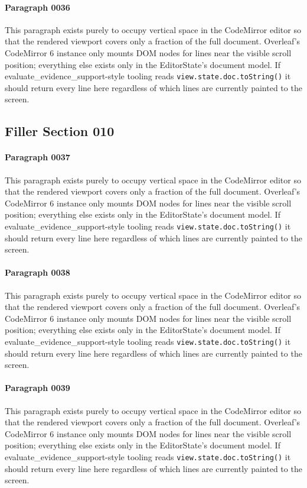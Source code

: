 \documentclass{article}
\begin{document}
\paragraph{Paragraph 0036}
This paragraph exists purely to occupy vertical space in the CodeMirror editor so that the rendered viewport covers only a fraction of the full document. Overleaf's CodeMirror 6 instance only mounts DOM nodes for lines near the visible scroll position; everything else exists only in the EditorState's document model. If evaluate\_evidence\_support-style tooling reads \texttt{view.state.doc.toString()} it should return every line here regardless of which lines are currently painted to the screen.

\subsection{Filler Section 010}
\paragraph{Paragraph 0037}
This paragraph exists purely to occupy vertical space in the CodeMirror editor so that the rendered viewport covers only a fraction of the full document. Overleaf's CodeMirror 6 instance only mounts DOM nodes for lines near the visible scroll position; everything else exists only in the EditorState's document model. If evaluate\_evidence\_support-style tooling reads \texttt{view.state.doc.toString()} it should return every line here regardless of which lines are currently painted to the screen.

\paragraph{Paragraph 0038}
This paragraph exists purely to occupy vertical space in the CodeMirror editor so that the rendered viewport covers only a fraction of the full document. Overleaf's CodeMirror 6 instance only mounts DOM nodes for lines near the visible scroll position; everything else exists only in the EditorState's document model. If evaluate\_evidence\_support-style tooling reads \texttt{view.state.doc.toString()} it should return every line here regardless of which lines are currently painted to the screen.

\paragraph{Paragraph 0039}
This paragraph exists purely to occupy vertical space in the CodeMirror editor so that the rendered viewport covers only a fraction of the full document. Overleaf's CodeMirror 6 instance only mounts DOM nodes for lines near the visible scroll position; everything else exists only in the EditorState's document model. If evaluate\_evidence\_support-style tooling reads \texttt{view.state.doc.toString()} it should return every line here regardless of which lines are currently painted to the screen.
\end{document}
